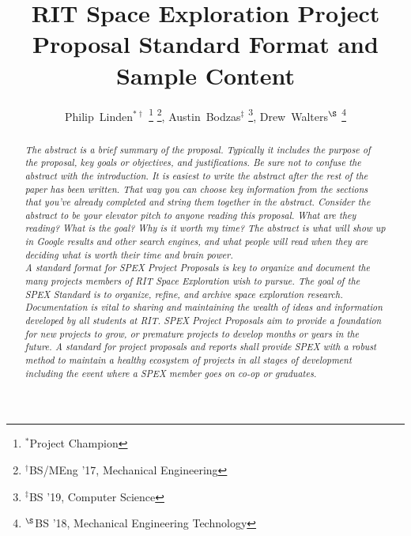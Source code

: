 \documentclass[journal]{SPEXformat}
\title{RIT Space Exploration Project Proposal Standard Format and Sample Content}
\author{
  Philip~Linden$^{*\dagger}$%
    \thanks{$^{*}$Project Champion}%
    \thanks{$^{\dagger}$BS/MEng '17, Mechanical Engineering},
  Austin~Bodzas$^{\ddagger}$%
    \thanks{$^{\ddagger}$BS '19, Computer Science},
  Drew~Walters$^{\S}$%
    \thanks{$^{\S}$BS '18, Mechanical Engineering Technology}
}
\newcommand*{\HELP}{}%
\begin{document}
\maketitle

\begin{abstract}
\ifdefined\HELP\em
  The abstract is a brief summary of the proposal. Typically it includes the purpose of the proposal, key goals or objectives, and justifications.
  Be sure not to confuse the abstract with the introduction.
  It is easiest to write the abstract after the rest of the paper has been written.
  That way you can choose key information from the sections that you've already completed and string them together in the abstract.
  Consider the abstract to be your elevator pitch to anyone reading this proposal.
  What are they reading?
  What is the goal?
  Why is it worth my time?
  The abstract is what will show up in Google results and other search engines, and what people will read when they are deciding what is worth their time and brain power.\\
\em\fi
A standard format for SPEX Project Proposals is key to organize and document the many projects members of RIT Space Exploration wish to pursue. The goal of the SPEX Standard is to organize, refine, and archive space exploration research.
Documentation is vital to sharing and maintaining the wealth of ideas and information developed by all students at RIT.\@
SPEX Project Proposals aim to provide a foundation for new projects to grow, or premature projects to develop months or years in the future.
A standard for project proposals and reports shall provide SPEX with a robust method to maintain a healthy ecosystem of projects in all stages of development including the event where a SPEX member goes on co-op or graduates.
\end{abstract}

\label{sec:nomenclature}
\newcommand{\nomunit}[1]{%
\renewcommand{\nomentryend}{\hspace*{\fill}#1}}
\ifdefined\HELP%
  \renewcommand{\nompreamble}{\em If you include mathematical expressions or express variables in the proposal, list them with their corresponding definitions here as a list.
  The two lines below make it look nice when defining units/values to constants.

  Note that math terms and non-math terms are separated and alphabetized, regardless of the order in which they are defined. (Recall terms \$like this\$ are in the math environment)
  Read more about advanced nomenclature formatting here:\\
  \url{https://www.sharelatex.com/learn/Nomenclatures} \em}
\fi
{}
\nomenclature{$c$}{Speed of light
 \nomunit{\,\SI{2.9979e8}{\meter\per\second}}}
\end{document}
